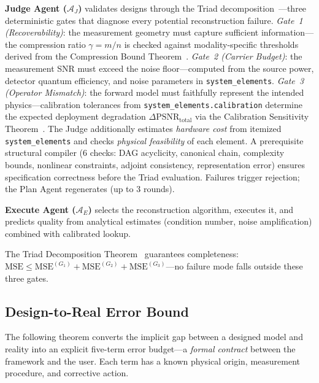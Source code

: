 \documentclass[11pt,a4paper]{article}
\newcommand{\Agent}{\mathcal{A}}
\begin{document}
\textbf{Judge Agent ($\Agent_J$)} validates designs through the Triad decomposition~\cite{paperII}---three deterministic gates that diagnose every potential reconstruction failure.
\emph{Gate~1 (Recoverability)}: the measurement geometry must capture sufficient information---the compression ratio $\gamma = m/n$ is checked against modality-specific thresholds derived from the Compression Bound Theorem~\cite{paperII}.
\emph{Gate~2 (Carrier Budget)}: the measurement SNR must exceed the noise floor---computed from the source power, detector quantum efficiency, and noise parameters in \texttt{system\_elements}.
\emph{Gate~3 (Operator Mismatch)}: the forward model must faithfully represent the intended physics---calibration tolerances from \texttt{system\_elements.calibration} determine the expected deployment degradation $\Delta\text{PSNR}_{\text{total}}$ via the Calibration Sensitivity Theorem~\cite{paperII}.
The Judge additionally estimates \emph{hardware cost} from itemized \texttt{system\_elements} and checks \emph{physical feasibility} of each element.  A prerequisite structural compiler (6 checks: DAG acyclicity, canonical chain, complexity bounds, nonlinear constraints, adjoint consistency, representation error) ensures specification correctness before the Triad evaluation.  Failures trigger rejection; the Plan Agent regenerates (up to 3 rounds).

\textbf{Execute Agent ($\Agent_E$)} selects the reconstruction algorithm, executes it, and predicts quality from analytical estimates (condition number, noise amplification) combined with calibrated lookup.

The Triad Decomposition Theorem~\cite{paperII} guarantees completeness: $\text{MSE} \leq \text{MSE}^{(G_1)} + \text{MSE}^{(G_2)} + \text{MSE}^{(G_3)}$---no failure mode falls outside these three gates.

\subsection{Design-to-Real Error Bound}
\label{sec:theorem}

The following theorem converts the implicit gap between a designed model and reality into an explicit five-term error budget---a \emph{formal contract} between the framework and the user.  Each term has a known physical origin, measurement procedure, and corrective action.
\end{document}
